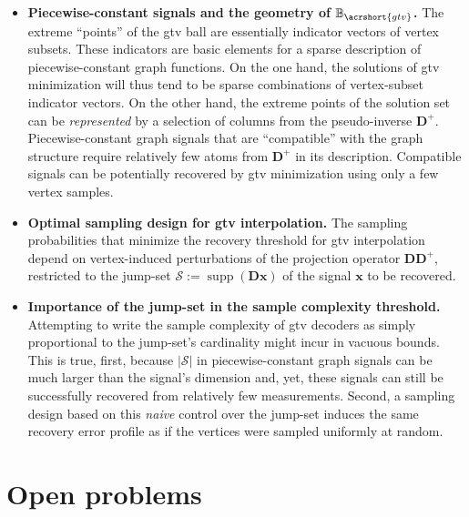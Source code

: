 \begin{itemize}
    \item \textbf{Piecewise-constant signals and the geometry of $\mathbb{B}_{\acrshort{gtv}}$.} The extreme ``points'' of the \acrfull{gtv} ball are essentially indicator vectors of vertex subsets. These indicators are basic elements for a sparse description of piecewise-constant graph functions. On the one hand, the solutions of \acrshort{gtv} minimization will thus tend to be sparse combinations of vertex-subset indicator vectors. On the other hand, the extreme points of the solution set can be \emph{represented} by a selection of columns from the pseudo-inverse $\mathbf{D}^{+}$. Piecewise-constant graph signals that are ``compatible'' with the graph structure require relatively few atoms from $\mathbf{D}^{+}$ in its description. Compatible signals can be potentially recovered by \acrshort{gtv} minimization using only a few vertex samples.
    \item \textbf{Optimal sampling design for \acrshort{gtv} interpolation.} The sampling probabilities that minimize the recovery threshold for \acrshort{gtv} interpolation depend on vertex-induced perturbations of the projection operator $\mathbf{D D}^{+}$, restricted to the jump-set $\mathcal{S} := \operatorname{supp}\left ( \mathbf{Dx} \right )$ of the signal $\mathbf{x}$ to be recovered.
    \item \textbf{Importance of the jump-set in the sample complexity threshold.} Attempting to write the sample complexity of \acrshort{gtv} decoders as simply proportional to the jump-set's cardinality might incur in vacuous bounds. This is true, first, because $|\mathcal{S}|$ in piecewise-constant graph signals can be much larger than the signal's dimension and, yet, these signals can still be successfully recovered from relatively few measurements. Second, a sampling design based on this \emph{naive} control over the jump-set induces the same recovery error profile as if the vertices were sampled uniformly at random.
\end{itemize}

\section{Open problems}

